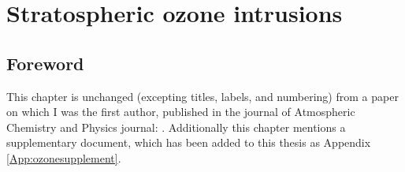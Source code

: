 
%
%  
%  
%  


\chapter{Stratospheric ozone intrusions} %
\label{Ozone} %


\section{Foreword}
  This chapter is unchanged (excepting titles, labels, and numbering) from a paper on which I was the first author, published in the journal of Atmospheric Chemistry and Physics journal: .
  Additionally this chapter mentions a supplementary document, which has been added to this thesis as Appendix \ref{App:ozonesupplement}.


